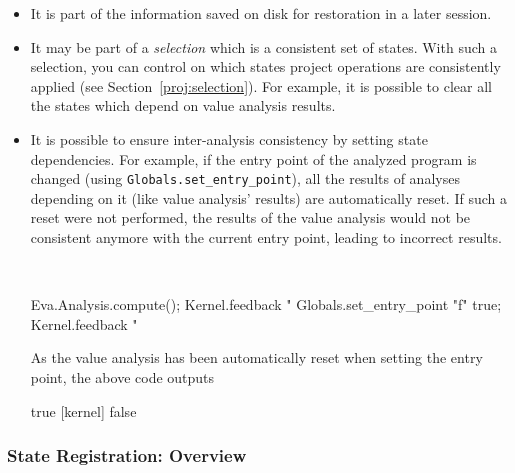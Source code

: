 \begin{itemize}
\item It is part of the information saved on disk for restoration
  in a later session.
\item It may be part of a \emph{selection} which is a
  consistent set of states.
  With such a selection,
  you can control on which states project operations are consistently applied
  (see Section~\ref{proj:selection}). For example, it is possible to clear all
  the states which depend on value analysis results.
\item It is possible to ensure inter-analysis consistency by
  setting state dependencies. For example, if the entry
  point of the analyzed program is changed (using
  \texttt{Globals.set\_entry\_point}), all
  the results of analyses depending on it (like value analysis' results) are
  automatically reset. If such a reset were not performed, the results of the
  value analysis would not be consistent anymore with the current entry point,
  leading to incorrect results.
\begin{example}
~

\begin{ocamlcode}
Eva.Analysis.compute();
Kernel.feedback "%
Globals.set_entry_point "f" true;
Kernel.feedback "%
\end{ocamlcode}
As the value analysis has been automatically reset when setting the entry point,
the above code outputs
\begin{logs}
[kernel] true
[kernel] false
\end{logs}
\end{example}
\end{itemize}

\subsubsection{State Registration: Overview}

